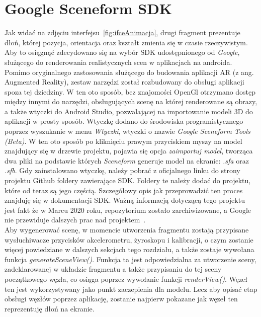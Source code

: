 \section{Google Sceneform SDK}
\label{sec:sceneform}
Jak widać na zdjęciu interfejsu~\ref{fig:ifceAnimacja}, drugi fragment prezentuje dłoń, której pozycja, orientacja oraz kształt zmienia się w czasie rzeczywistym. Aby to osiągnąć zdecydowano się na wybór SDK udostępnionego od \textit{Google}, służącego do renderowania realistycznych scen w aplikacjach na androida. Pomimo oryginalnego zastosowania służącego do budowania aplikacji AR (z ang. Augmented Reality), zestaw narzędzi został rozbudowany do obsługi aplikacji spoza tej dziedziny. W ten oto sposób, bez znajomości OpenGl otrzymano dostęp między innymi do narzędzi, obsługujących scenę na której renderowane są obrazy, a także wtyczki do Android Studio, pozwalającej na importowanie modeli 3D do aplikacji w prosty sposób. Wtyczkę dodano do środowiska programistycznego poprzez wyszukanie w menu \textit{Wtyczki}, wtyczki o nazwie \textit{Google Sceneform Tools (Beta)}. W ten oto sposób po kliknięciu prawym przyciskiem myszy na model znajdujący się w drzewie projektu, pojawia się opcja \textit{zaimportuj model}, tworząca dwa pliki na podstawie których \textit{Sceneform} generuje model na ekranie: \textit{.sfa} oraz \textit{.sfb}. Gdy zainstalowano wtyczkę, należy pobrać z oficjalnego linku do strony projektu Github foldery zawierające SDK. Foldery te należy dodać do projektu, które od teraz są jego częścią. Szczegółowy opis jak przeprowadzić ten proces znajduję się w dokumentacji SDK. Ważną informacją dotyczącą tego projektu jest fakt że w Marcu 2020 roku, repozytorium zostało zarchiwizowane, a Google nie przewiduje dalszych prac nad projektem~\cite{sceneform}. \\
Aby wygenerować scenę, w momencie utworzenia fragmentu zostają przypisane wysłuchiwacze przycisków akcelerometru, żyroskopu i kalibracji, o czym zostanie więcej powiedziane w dalszych sekcjach tego rozdziału, a także zostaje wywołana funkcja \textit{generateSceneView()}. Funkcja ta jest odpowiedzialna za utworzenie sceny, zadeklarowanej w układzie fragmentu a także przypisaniu do tej sceny początkowego węzła, co osiąga poprzez wywołanie funkcji \textit{renderView()}. Węzeł ten jest wykorzystywany jako punkt zaczepienia dla modelu. Lecz aby opisać etap obsługi węzłów poprzez aplikację, zostanie najpierw pokazane jak węzeł ten reprezentuję dłoń na ekranie.
